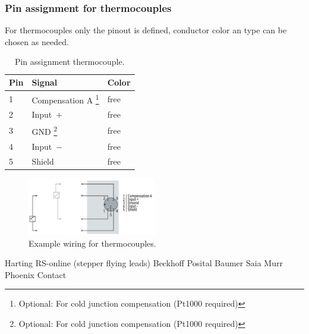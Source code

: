 \documentclass[english]{psi_easy}
\begin{document}
\subsubsection{Pin assignment for thermocouples}
For thermocouples only the pinout is defined, conductor color an type can be chosen as needed.

\begin{table}[H]
\centering
\caption{\label{tab:TCPinout}Pin assignment thermocouple.}
\begin{tabular}{@{}p{1cm}p{4cm}p{4cm}@{}}
\toprule
Pin & Signal & Color             \\ \midrule
1   & Compensation A \footnote{Optional: For cold junction compensation (Pt1000 required)}   & free \\ \midrule
2   & Input~$+$           & free \\ \midrule
3   & GND \footnote{Optional: For cold junction compensation (Pt1000 required)}              & free \\ \midrule
4   & Input~$-$           & free  \\ \midrule
5   & Shield            & free  \\ \bottomrule
\end{tabular}
\end{table}

\begin{figure}[H]
\centering
\includegraphics[width=0.5\textwidth]{Figures/ThermocoupleWiring.jpg}
\caption{\label{fig:ThermocoupleWiring}Example wiring for thermocouples.}
\end{figure}


Harting
RS-online (stepper flying leads)
Beckhoff
Posital
Baumer
Saia
Murr
Phoenix Contact

\cite{BeckhoffWeb}
\cite{HartingWeb}









\end{document}
